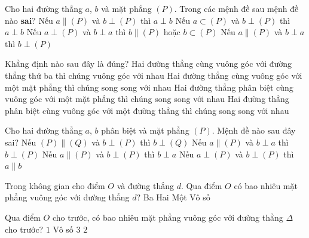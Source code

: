 \begin{ex}%
	Cho hai đường thẳng $a$, $b$ và mặt phẳng $(P)$. Trong các mệnh đề sau mệnh đề  nào \textbf{sai}?
	 \choice
		{Nếu $a\parallel  (P)$ và $b\perp (P)$ thì $a\perp b$}
		{Nếu  $a\subset (P)$ và $b\perp (P)$ thì $a\perp b$}
		{Nếu  $a\perp (P)$ và $b\perp a$ thì $b\parallel (P)$ hoặc $b\subset (P)$}
		{\True Nếu $a\parallel (P)$  và $b\perp a$ thì $b\perp (P)$}
\end{ex}

\begin{ex}%
	Khẳng định nào  sau đây là đúng?
	 \choice
		{Hai đường thẳng cùng vuông góc  với đường thẳng thứ ba thì chúng vuông góc với nhau}
		{Hai đường thẳng cùng vuông góc với một mặt phẳng  thì chúng song song với nhau}
		{\True Hai đường thẳng phân biệt  cùng vuông góc với một mặt phẳng thì chúng song song với nhau}
		{Hai đường thẳng phân biệt cùng vuông góc với một  đường thẳng thì chúng song song với nhau}
\end{ex}

\begin{ex}%
	Cho hai đường thẳng $a$, $b$ phân  biệt và mặt phẳng $(P)$. Mệnh đề nào sau đây sai?
	\choice 
		{Nếu $(P)\parallel (Q)$  và $b\perp (P)$ thì $b\perp (Q)$}
		{\True Nếu $a\parallel (P)$ và $b\perp a$ thì $b\perp (P)$} 
		{Nếu $a\parallel  (P)$ và $b\perp (P)$ thì $b\perp a$}
		{Nếu $a\perp (P)$ và $b\perp  (P)$ thì $a\parallel b$}
\end{ex}

\begin{ex}%
	Trong không gian cho điểm $O$ và  đường thẳng $d$. Qua điểm $O$ có bao nhiêu mặt phẳng vuông góc với đường thẳng $d$?
	 \choice
		{Ba} 
		{Hai} 
		 {\True Một}
		 {Vô số}
\end{ex}

\begin{ex}%
	Qua điểm $O$ cho trước, có bao nhiêu mặt phẳng vuông góc với  đường thẳng $\Delta$ cho trước?
	\choice 
		 {\True $1$}
		{Vô  số}
		{$3$} 
		{$2$} 
\end{ex}

